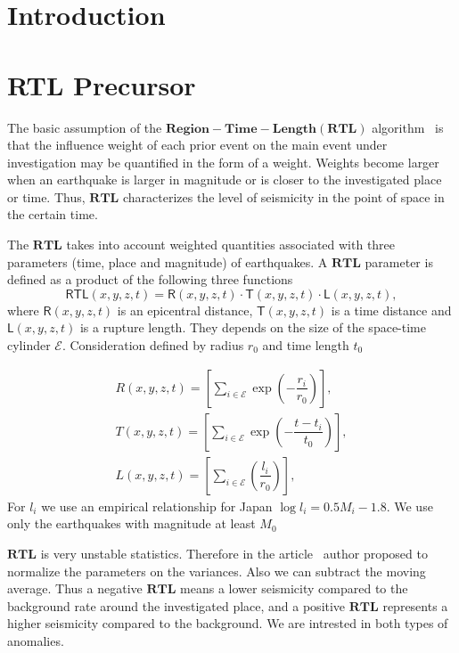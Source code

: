 \documentclass[12pt]{article}
\let\vec=\mathbf
\begin{document}
\section{Introduction}

\section{RTL Precursor}
The basic assumption of the $\vec{Region-Time-Length(RTL)}$ algorithm~\cite{RTL-Sobolev} is that the influence weight of each prior event on the main event under investigation may be quantified in the form of a weight. Weights become larger when an earthquake is larger in magnitude or is closer to the investigated place or time. Thus, $\vec{RTL}$ characterizes the level of seismicity in the point of space in the certain time. 

The $\vec{RTL}$ takes into account weighted quantities associated with three parameters (time, place and magnitude) of earthquakes. A $\vec{RTL}$ parameter is defined as a product of the following three functions
\begin{equation}
	\label{RTL Precursor}
	\mathsf{RTL}(x,y,z,t) = \mathsf{R}(x,y,z,t)\cdot \mathsf{T}(x,y,z,t)\cdot \mathsf{L}(x,y,z,t),
\end{equation}
where $\mathsf{R}(x,y,z,t)$ is an epicentral distance, $\mathsf{T}(x,y,z,t)$ is a time distance and 
$\mathsf{L}(x,y,z,t)$ is a rupture length. They depends on the size of the space-time cylinder $\mathcal{E}$. Consideration defined by radius $r_0$ and time length $t_0$

\begin{equation}
\begin{split}
R(x,y,z,t) = \left[\sum\limits_{i\in\mathcal{E}}\exp\left(-\dfrac{r_i}{r_0}\right)\right], \\
T(x,y,z,t) = \left[\sum\limits_{i\in\mathcal{E}}\exp\left(-\dfrac{t-t_i}{t_0}\right)\right], \\
L(x,y,z,t) = \left[\sum\limits_{i\in\mathcal{E}}\left(\dfrac{l_i}{r_0}\right)\right],
\end{split}
\end{equation}
For $l_i$ we use an empirical relationship for Japan  $\log l_i = 0.5M_i - 1.8$. We use only the earthquakes with magnitude at least $M_0$

$\vec{RTL}$ is very unstable statistics. Therefore in the article~\cite{RTL-Huang} author proposed to normalize the parameters on the variances. Also we can subtract the moving average. Thus a negative $\vec{RTL}$ means a lower seismicity compared to the background rate around the investigated place, and a positive $\vec{RTL}$ represents a higher seismicity compared to the background. We are intrested in both types of anomalies.      
\end{document}

